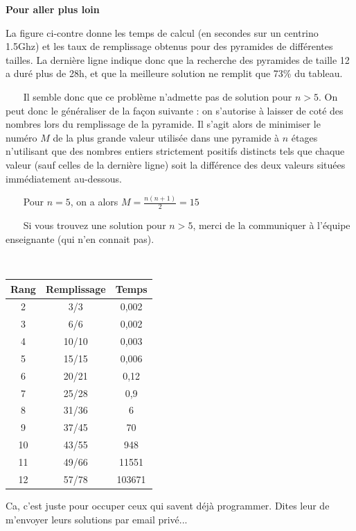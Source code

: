 \documentclass[10pt]{article}\usepackage[nu]{esial}
\begin{document}
\begin{Exercice}\textbf{Pour aller plus loin}

\noindent\begin{minipage}{.7\linewidth}
    
  La figure ci-contre donne les temps de calcul (en secondes sur un centrino
  1.5Ghz) et les taux de remplissage obtenus pour des pyramides de différentes
  tailles. La dernière ligne indique donc que la recherche des pyramides de
  taille 12 a duré plus de 28h, et que la meilleure solution ne remplit que
  73\% du tableau.

  ~~~ Il semble donc que ce problème n'admette pas de solution pour $n>5$. On
  peut donc le généraliser de la façon suivante : on s'autorise à laisser de
  coté des nombres lors du remplissage de la pyramide. Il s'agit alors de
  minimiser le numéro $M$ de la plus grande valeur utilisée dans une pyramide à
  $n$ étages n'utilisant que des nombres entiers strictement positifs distincts
  tels que chaque valeur (sauf celles de la dernière ligne) soit la différence
  des deux valeurs situées immédiatement au-dessous.

  ~~~ Pour $n=5$, on a alors $M=\frac{n(n+1)}{2}=15$

  ~~~ Si vous trouvez une solution pour $n>5$, merci de la communiquer à
  l'équipe enseignante (qui n'en connait pas).

    
  \end{minipage}~~~\begin{minipage}{.3\linewidth}
\begin{tabular}{|c|c|c|}
\hline
Rang & Remplissage & Temps\\
\hline
 2 &  3/3  & 0,002\\
 3 &  6/6  & 0,002\\
 4 & 10/10 & 0,003\\
 5 & 15/15 & 0,006\\
 6 & 20/21 & 0,12 \\
 7 & 25/28 & 0,9  \\
 8 & 31/36 & 6    \\
 9 & 37/45 & 70   \\
10 & 43/55 & 948  \\
11 & 49/66 & 11551\\
12 & 57/78 & 103671\\
\hline
\end{tabular}

  \end{minipage}
  

\end{Exercice}

\begin{Reponse}
  Ca, c'est juste pour occuper ceux qui savent déjà programmer. Dites leur de
  m'envoyer leurs solutions par email privé...
\end{Reponse}
\end{document}
